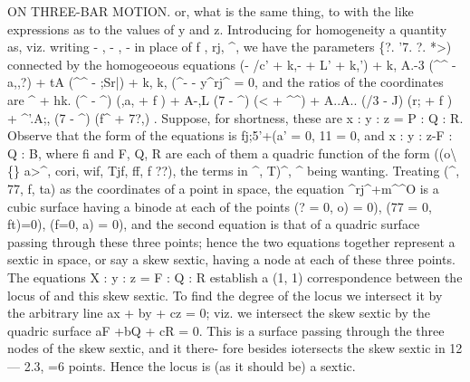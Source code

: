 \documentclass[11pt,a4paper]{book}
\begin{document}
ON THREE-BAR MOTION.
or, what
is the same
thing,
to
with
the
like
expressions
as
to
the
values
of y
and
z.
Introducing
for
homogeneity
a
quantity
as,
viz.
writing -
,
-
,
-
in
place
of
f
,
rj,
\textasciicircum{},
we
have
the
parameters
\{?.
'7.
?.
\guillemotleft{}*>) connected by the homogeoeous equations
(- /c' + k,- + L' + k,') \guillemotleft{}\guillemotright{} + k, A.-3 (\textasciicircum{}\textasciicircum{} - a,,?) + tA (\textasciicircum{}\textasciicircum{} - ;Sr|) + k, k, (\textasciicircum{}- - y\textasciicircum{}rj\textasciicircum{} = 0,
and
the
ratios of the coordinates are
\guillemotright{}\textasciicircum{} + hk. (\textasciicircum{} -
\textasciicircum{})
(\guillemotleft{},a, + f
) + A-,L (7 -
\textasciicircum{}) (<\guillemotleft{} + \textasciicircum{}\textasciicircum{})
+ A..A.. (/3 -
J) (r;\guillemotleft{} + f
) + \textasciicircum{}'.A;, (7 -
\textasciicircum{})
(f\textasciicircum{} + 7?,)
.
Suppose,
for
shortness, these
are x
: y
:
z = P
: Q
: R.
Observe
that
the
form
of
the
equations
is
fj;5'+(a' = 0,
11 = 0, and x
: y
: z-F
: Q
:
B, where
fi
and
F,
Q, R
are each of them a quadric function
of
the
form
((o\textbackslash\{\}
a>\textasciicircum{},
cori,
wif,
Tjf,
ff, f ??), the terms
in
\textasciicircum{},
T)\textasciicircum{}, \textasciicircum{} being wanting.
Treating
(\textasciicircum{},
77,
f,
ta) as the coordinates of a point
in
space, the equation \textasciicircum{}rj\textasciicircum{}+m\textasciicircum{}\textasciicircum{}O
is
a
cubic
surface
having
a
binode
at
each
of
the
points (? = 0,
o) = 0),
(77 = 0,
ft)=0),
(f=0,
a) = 0),
and
the
second
equation
is
that
of
a
quadric
surface
passing
through
these
three
points;
hence
the
two
equations
together
represent
a
sextic
in
space,
or
say
a
skew
sextic,
having
a
node
at
each
of
these
three
points.
The
equations
X
: y
:
z = F
: Q
: R
establish
a
(1,
1)
correspondence
between
the
locus
of
and
this
skew
sextic.
To
find the degree
of
the
locus we
intersect
it by the
arbitrary
line
ax + by + cz = 0;
viz. we intersect the skew sextic by the quadric
surface aF +bQ + cR = 0.
This
is
a
surface
passing
through
the
three
nodes
of
the
skew
sextic,
and
it
there-
fore
besides
iotersects
the
skew
sextic
in
12 --- 2.3, =6
points.
Hence
the
locus
is
(as
it should be) a
sextic.
\end{document}

